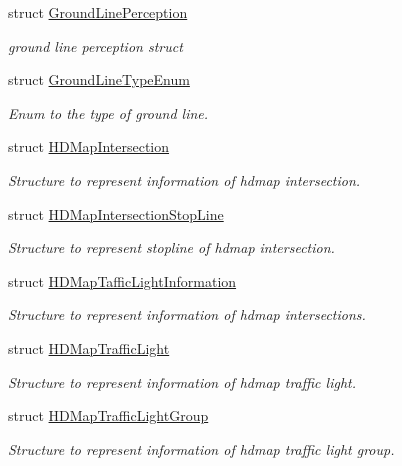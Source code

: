 \begin{DoxyCompactItemize}
struct \hyperlink{structmaf__perception__interface_1_1GroundLinePerception}{Ground\+Line\+Perception}
\begin{DoxyCompactList}\small\item\em ground line perception struct \end{DoxyCompactList}\item 
struct \hyperlink{structmaf__perception__interface_1_1GroundLineTypeEnum}{Ground\+Line\+Type\+Enum}
\begin{DoxyCompactList}\small\item\em Enum to the type of ground line. \end{DoxyCompactList}\item 
struct \hyperlink{structmaf__perception__interface_1_1HDMapIntersection}{H\+D\+Map\+Intersection}
\begin{DoxyCompactList}\small\item\em Structure to represent information of hdmap intersection. \end{DoxyCompactList}\item 
struct \hyperlink{structmaf__perception__interface_1_1HDMapIntersectionStopLine}{H\+D\+Map\+Intersection\+Stop\+Line}
\begin{DoxyCompactList}\small\item\em Structure to represent stopline of hdmap intersection. \end{DoxyCompactList}\item 
struct \hyperlink{structmaf__perception__interface_1_1HDMapTafficLightInformation}{H\+D\+Map\+Taffic\+Light\+Information}
\begin{DoxyCompactList}\small\item\em Structure to represent information of hdmap intersections. \end{DoxyCompactList}\item 
struct \hyperlink{structmaf__perception__interface_1_1HDMapTrafficLight}{H\+D\+Map\+Traffic\+Light}
\begin{DoxyCompactList}\small\item\em Structure to represent information of hdmap traffic light. \end{DoxyCompactList}\item 
struct \hyperlink{structmaf__perception__interface_1_1HDMapTrafficLightGroup}{H\+D\+Map\+Traffic\+Light\+Group}
\begin{DoxyCompactList}\small\item\em Structure to represent information of hdmap traffic light group. \end{DoxyCompactList}\item 

\end{DoxyCompactItemize}
